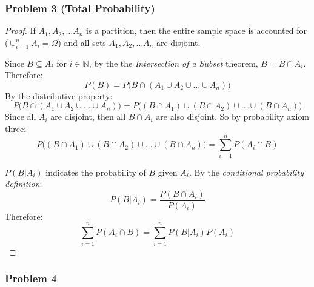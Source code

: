 \documentclass[11pt]{extarticle}
\begin{document}
\subsubsection*{Problem 3 (Total Probability)}

\begin{proof}[Proof]

If $A_1, A_2, \dots A_n$ is a partition, then the entire sample space is accounted for ($\cup_{i=1}^n A_i = \Omega $) and all sets $A_1, A_2, \dots A_n$ are disjoint. 

Since $B \subseteq A_i$ for $i \in \mathbb{N}$, by the the \textit{Intersection of a Subset} theorem, $B = B \cap A_i$. Therefore:
$$P(B) = P \Big( B \cap \left( A_1 \cup A_2 \cup \dots \cup A_n \right) \Big)$$
By the distributive property:
$$P \Big( B \cap \left( A_1 \cup A_2 \cup \dots \cup A_n \right) \Big) = P \Big( (B \cap A_1) \cup (B \cap A_2) \cup \dots \cup (B \cap A_n)   \Big)$$
Since all $A_i$ are disjoint, then all  $ B \cap A_i$ are also disjoint. So by probability axiom three:
$$P \Big( (B \cap A_1) \cup (B \cap A_2) \cup \dots \cup (B \cap A_n)   \Big) = \sum_{i=1}^{n} P(A_i \cap B)$$

$P(B | A_i)$ indicates the probability of $B$ given $A_i$. By the \textit{conditional probability definition}: $$P(B | A_i) = \frac{P(B \cap A_i)}{P(A_i)} $$
Therefore: $$ \sum_{i=1}^{n} P(A_i \cap B) = \sum_{i=1}^{n}  P(B | A_i) P(A_i)$$
\end{proof}

\subsubsection*{Problem 4}


\end{document}
